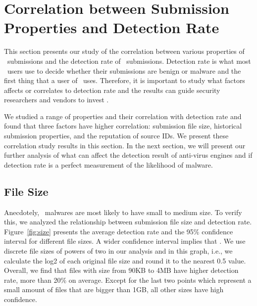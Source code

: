 \section{Correlation between Submission Properties and Detection Rate}
\label{sec:corr}
This section presents our study of the correlation between various properties of \pe\ submissions and the detection rate of \pe\ submissions.
Detection rate is what most \vt\ users use to decide whether their submissions are benign or malware 
and the first thing that a user of \vt\ uses.
Therefore, it is important to study what factors affects or correlates to detection rate
and the results can guide security researchers and vendors to invest . 

We studied a range of properties and their correlation with detection rate
and found that three factors have higher correlation:
submission file size,
historical submission properties, and the reputation of source IDs.
We present these correlation study results in this section.
In the next section, we will present our further analysis of what can affect the detection result of anti-virus engines
and if detection rate is a perfect measurement of the likelihood of malware.

%



\subsection{File Size}
\label{sec:size}
Anecdotely, \pe\ malwares are most likely to have small to medium size. 
To verify this, we analyzed the relationship between submission file size and detection rate. 
Figure~\ref{fig:size} presents the average detection rate and 
the 95\% confidence interval for different file sizes.
A wider confidence interval implies that .
We use discrete file sizes of powers of two in our analysis and in this graph,
i.e., we calculate the log2 of each original file size and round it to the nearest 0.5 value.
Overall, we find that files with size from 90KB to 4MB have higher detection rate, more than 20\% on average. 
Except for the last two points which represent a small amount of files that are bigger than 1GB, 
all other sizes have high confidence.   

